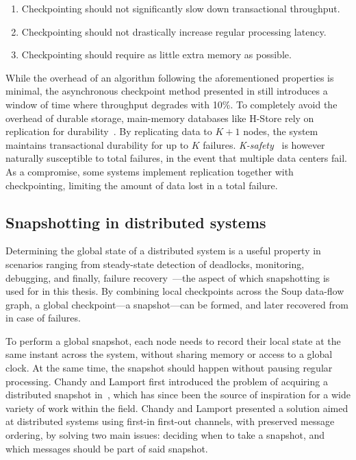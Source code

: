 \begin{enumerate}
  \item Checkpointing should not significantly slow down transactional throughput.
  \item Checkpointing should not drastically increase regular processing latency.
  \item Checkpointing should require as little extra memory as possible.
\end{enumerate}

While the overhead of an algorithm following the aforementioned properties is
minimal, the asynchronous checkpoint method presented in
\cite{memory-checkpoint} still introduces a window of time where throughput
degrades with 10\%. To completely avoid the overhead of durable storage,
main-memory databases like H-Store rely on replication for
durability~\cite{hstore}. By replicating data to $ K + 1 $ nodes, the system
maintains transactional durability for up to $ K $ failures.
\textit{K-safety}~\cite{cstore} is however naturally susceptible to total
failures, \eg in the event that multiple data centers fail. As a compromise,
some systems implement replication together with checkpointing, limiting the
amount of data lost in a total failure.

\subsection{Snapshotting in distributed systems}\label{sec:rel-snapshotting}

Determining the global state of a distributed system is a useful property in
scenarios ranging from steady-state detection of deadlocks, monitoring,
debugging, and finally, failure recovery~\cite{intro-snapshot}---the aspect of
which snapshotting is used for in this thesis. By combining local checkpoints
across the Soup data-flow graph, a global checkpoint---a snapshot---can be
formed, and later recovered from in case of failures.

To perform a global snapshot, each node needs to record their local state at the
same instant across the system, without sharing memory or access to a global
clock. At the same time, the snapshot should happen without pausing regular
processing. Chandy and Lamport first introduced the problem of acquiring a
distributed snapshot in~\cite{chandy-lamport}, which has since been the source
of inspiration for a wide variety of work within the field. Chandy and Lamport
presented a solution aimed at distributed systems using first-in first-out
channels, with preserved message ordering, by solving two main issues: deciding
when to take a snapshot, and which messages should be part of said snapshot.

